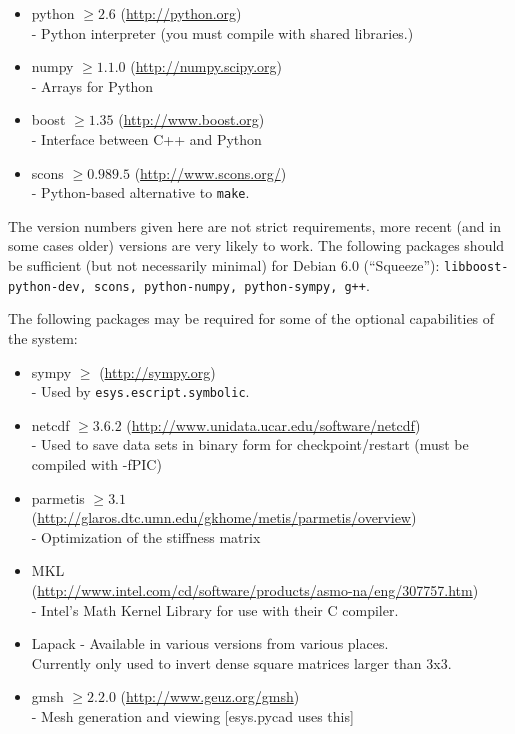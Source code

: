 \begin{itemize}
 \item python $\geq 2.6$ (\url{http://python.org}) \\-
        Python interpreter (you must compile with shared libraries.)
 \item numpy $\geq 1.1.0$ (\url{http://numpy.scipy.org}) \\-
        Arrays for Python
 \item boost $\geq 1.35$ (\url{http://www.boost.org}) \\-
        Interface between C++ and Python
 \item scons $\geq 0.989.5$ (\url{http://www.scons.org/}) \\-
        Python-based alternative to \texttt{make}.
\end{itemize}

The version numbers given here are not strict requirements, more recent (and in some cases older) versions are very likely to work.
The following packages should be sufficient (but not necessarily minimal) for Debian 6.0 (``Squeeze''):
\texttt{libboost-python-dev, scons, python-numpy, python-sympy, g++}.

\noindent The following packages may be required for some of the optional capabilities of the system:
\begin{itemize}
 \item sympy $\geq$ (\url{http://sympy.org}) \\-
        Used by \texttt{esys.escript.symbolic}.
 \item netcdf $\geq 3.6.2$ (\url{http://www.unidata.ucar.edu/software/netcdf}) \\-
        Used to save data sets in binary form for checkpoint/restart (must be compiled with -fPIC)
 \item parmetis $\geq 3.1$ (\url{http://glaros.dtc.umn.edu/gkhome/metis/parmetis/overview}) \\-
        Optimization of the stiffness matrix
 \item MKL \\(\url{http://www.intel.com/cd/software/products/asmo-na/eng/307757.htm}) \\-
        Intel's Math Kernel Library for use with their C compiler.
\item Lapack - Available in various versions from various places. \\ 
Currently only used to invert dense square matrices larger than 3x3. 
 \item gmsh $\geq 2.2.0$ (\url{http://www.geuz.org/gmsh}) \\-
        Mesh generation and viewing [esys.pycad uses this]
\end{itemize}

